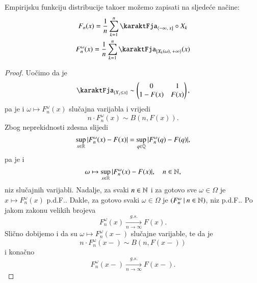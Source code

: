 \begin{nap} \label{nap:18.5-1}
    Empirijsku funkciju distribucije tako\dj er mo\v zemo zapisati na sljede\' ce na\v cine:
    \begin{equation*}
        \begin{gathered}
            F_n (x) =    \frac{1}{n} \suma{k = 1}{n} \karaktFja_{\lijInt{-\infty}{x}} \circ X_k\\
            F^\omega_n (x) = \frac{1}{n} \suma{k = 1}{n} \karaktFja_{\desInt{X_k(\omega)}{+\infty}}(x)
        \end{gathered}
    \end{equation*}
\end{nap}

\begin{proof}
    Uo\v cimo da je
    \begin{equation*}
        \karaktFja_{\{X_j \leq x\}} \sim
        \begin{pmatrix}
            0 & 1\\
            1 - F (x) & F (x)
        \end{pmatrix},
    \end{equation*}
    pa je i $\omega \mapsto F^\omega_n (x)$ slu\v cajna varijabla i vrijedi
    \begin{equation*}
        n \cdot F^\omega_n (x) \sim B(n, F(x)).
    \end{equation*}
    Zbog neprekidnosti zdesna slijedi
    \begin{equation*}
        \sup\limits_{x \in \mathbb{R}} |F^\omega_n (x) - F (x)| = \sup\limits_{q \in \mathbb{Q}} |F^\omega_n (q) - F (q)|,
    \end{equation*}
    pa je i
    \begin{equation*}
        \omega \mapsto \sup\limits_{x \in \mathbb{R}} |F^\omega_n (x) - F (x)|, \quad n \in \mathbb{N},
    \end{equation*}
    niz slu\v cajnih varijabli.
    Nadalje, za svaki $n \in \mathbb{N}$ i za gotovo sve $\omega \in \Omega$ je $x \mapsto F^\omega_n (x)$ p.d.F..
    Dakle, za gotovo svaki $\omega \in \Omega$ je $({F^\omega_n} \: | \: {n \in \mathbb{N}})$, niz p.d.F..
    Po jakom zakonu velikih brojeva
    \begin{equation*}
        F^\omega_n (x) \xrightarrow[n \to \infty]{g.s.} F(x).
    \end{equation*}
    Sli\v cno dobijemo i da su $\omega \mapsto F^\omega_n (x-)$ slu\v cajne varijable, te da je
    \begin{equation*}
        n \cdot F^\omega_n (x-) \sim B(n, F(x-))
    \end{equation*}
    i kona\v cno
    \begin{equation*}
        F^\omega_n (x-) \xrightarrow[n \to \infty]{g.s.} F(x-).
    \end{equation*}
    

\end{proof}
